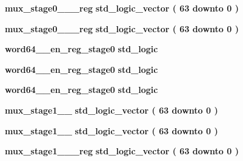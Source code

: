 \begin{DoxyCompactItemize}
\item 
{\bf mux\+\_\+stage0\+\_\+\_\+\_\+reg} {\bfseries \textcolor{comment}{std\+\_\+logic\+\_\+vector}\textcolor{vhdlchar}{ }\textcolor{vhdlchar}{(}\textcolor{vhdlchar}{ }\textcolor{vhdlchar}{ } \textcolor{vhdldigit}{63} \textcolor{vhdlchar}{ }\textcolor{keywordflow}{downto}\textcolor{vhdlchar}{ }\textcolor{vhdlchar}{ } \textcolor{vhdldigit}{0} \textcolor{vhdlchar}{ }\textcolor{vhdlchar}{)}\textcolor{vhdlchar}{ }} 
\item 
{\bf mux\+\_\+stage0\+\_\+\_\+\_\+reg} {\bfseries \textcolor{comment}{std\+\_\+logic\+\_\+vector}\textcolor{vhdlchar}{ }\textcolor{vhdlchar}{(}\textcolor{vhdlchar}{ }\textcolor{vhdlchar}{ } \textcolor{vhdldigit}{63} \textcolor{vhdlchar}{ }\textcolor{keywordflow}{downto}\textcolor{vhdlchar}{ }\textcolor{vhdlchar}{ } \textcolor{vhdldigit}{0} \textcolor{vhdlchar}{ }\textcolor{vhdlchar}{)}\textcolor{vhdlchar}{ }} 
\item 
{\bf word64\+\_\+\_\+en\+\_\+reg\+\_\+stage0} {\bfseries \textcolor{comment}{std\+\_\+logic}\textcolor{vhdlchar}{ }} 
\item 
{\bf word64\+\_\+\_\+en\+\_\+reg\+\_\+stage0} {\bfseries \textcolor{comment}{std\+\_\+logic}\textcolor{vhdlchar}{ }} 
\item 
{\bf word64\+\_\+\_\+en\+\_\+reg\+\_\+stage0} {\bfseries \textcolor{comment}{std\+\_\+logic}\textcolor{vhdlchar}{ }} 
\item 
{\bf mux\+\_\+stage1\+\_\+\_} {\bfseries \textcolor{comment}{std\+\_\+logic\+\_\+vector}\textcolor{vhdlchar}{ }\textcolor{vhdlchar}{(}\textcolor{vhdlchar}{ }\textcolor{vhdlchar}{ } \textcolor{vhdldigit}{63} \textcolor{vhdlchar}{ }\textcolor{keywordflow}{downto}\textcolor{vhdlchar}{ }\textcolor{vhdlchar}{ } \textcolor{vhdldigit}{0} \textcolor{vhdlchar}{ }\textcolor{vhdlchar}{)}\textcolor{vhdlchar}{ }} 
\item 
{\bf mux\+\_\+stage1\+\_\+\_} {\bfseries \textcolor{comment}{std\+\_\+logic\+\_\+vector}\textcolor{vhdlchar}{ }\textcolor{vhdlchar}{(}\textcolor{vhdlchar}{ }\textcolor{vhdlchar}{ } \textcolor{vhdldigit}{63} \textcolor{vhdlchar}{ }\textcolor{keywordflow}{downto}\textcolor{vhdlchar}{ }\textcolor{vhdlchar}{ } \textcolor{vhdldigit}{0} \textcolor{vhdlchar}{ }\textcolor{vhdlchar}{)}\textcolor{vhdlchar}{ }} 
\item 
{\bf mux\+\_\+stage1\+\_\+\_\+\_\+reg} {\bfseries \textcolor{comment}{std\+\_\+logic\+\_\+vector}\textcolor{vhdlchar}{ }\textcolor{vhdlchar}{(}\textcolor{vhdlchar}{ }\textcolor{vhdlchar}{ } \textcolor{vhdldigit}{63} \textcolor{vhdlchar}{ }\textcolor{keywordflow}{downto}\textcolor{vhdlchar}{ }\textcolor{vhdlchar}{ } \textcolor{vhdldigit}{0} \textcolor{vhdlchar}{ }\textcolor{vhdlchar}{)}\textcolor{vhdlchar}{ }} 

\end{DoxyCompactItemize}
